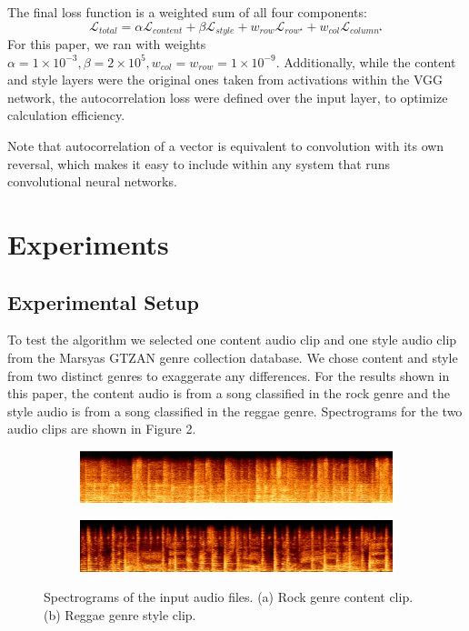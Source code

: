\documentclass{article}
\begin{document}
The final loss function is a weighted sum of all four components:
$$
\mathcal{L}_{total} = \alpha \mathcal{L}_{content} + \beta \mathcal{L}_{style} + w_{row} \mathcal{L}_{row^\star} + w_{col} \mathcal{L}_{column^\star}
$$
For this paper, we ran with weights $\alpha = 1\times10^{-3}, \beta = 2\times10^{5}, w_{col} = w_{row} = 1\times10^{-9}$. Additionally, while the content and style layers were the original ones taken from activations within the VGG network, the autocorrelation loss were defined over the input layer, to optimize calculation efficiency.

Note that autocorrelation of a vector is equivalent to convolution with its own reversal, which makes it easy to include within any system that runs convolutional neural networks.

\section{Experiments}

\subsection{Experimental Setup}

To test the algorithm we selected one content audio clip and one style audio clip from the Marsyas GTZAN genre collection database. We chose content and style from two distinct genres to exaggerate any differences. For the results shown in this paper, the content audio is from a song classified in the rock genre and the style audio is from a song classified in the reggae genre. Spectrograms for the two audio clips are shown in Figure 2.

\begin{figure}[!ht]
\begin{subfigure}{\textwidth}
  \centering
  \includegraphics[width = \textwidth]{content_spec}
  \caption{}
\end{subfigure}
\begin{subfigure}{\textwidth}
  \centering
  \includegraphics[width = \textwidth]{style_spec}
  \caption{}
\end{subfigure}
\caption{Spectrograms of the input audio files. (a) Rock genre content clip. (b) Reggae genre style clip.}
\end{figure}
\end{document}
